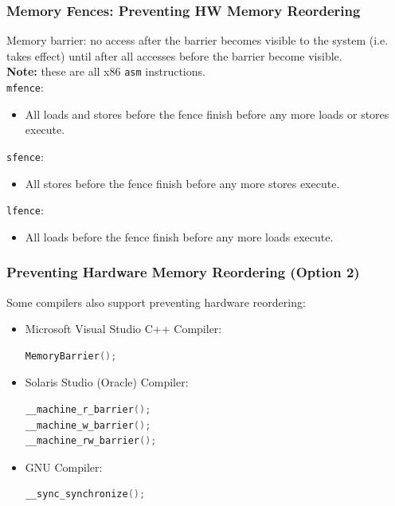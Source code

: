 \begin{frame}
  \frametitle{Memory Fences: Preventing HW Memory Reordering}


Memory barrier: no access after the barrier becomes visible to the
system (i.e. takes effect) until after all accesses before the barrier
become visible.\\[1em]

  {\bf Note:} these are all x86 {\tt asm} instructions.\\[1em]
  {\tt mfence}:
  \begin{itemize}
    \item All loads and stores before the fence finish before any more loads or stores execute.
  \end{itemize}
  {\tt sfence}:
  \begin{itemize}
    \item All stores before the fence finish before any more stores execute.
  \end{itemize}
  {\tt lfence}:
  \begin{itemize}
    \item All loads before the fence finish before any more loads execute.
  \end{itemize}
  
\end{frame}

\begin{frame}[fragile]
  \frametitle{Preventing Hardware Memory Reordering (Option 2)}

  
  Some compilers also support preventing hardware reordering:

\begin{itemize}
  \item Microsoft Visual Studio C++ Compiler:
  \begin{lstlisting}[language=C]
MemoryBarrier();
  \end{lstlisting}

  \item Solaris Studio (Oracle) Compiler:
  \begin{lstlisting}[language=C]
__machine_r_barrier();
__machine_w_barrier();
__machine_rw_barrier();
  \end{lstlisting}

  \item GNU Compiler:
  \begin{lstlisting}[language=C]
__sync_synchronize();
  \end{lstlisting}
\end{itemize}
  
\end{frame}

